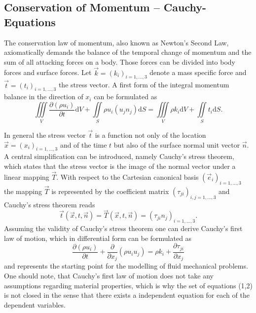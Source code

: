     \subsection{Conservation of Momentum -- Cauchy-Equations}

    The conservation law of momentum, also known as Newton's Second Law, axiomatically demands the balance of the temporal change of momentum and the sum of all attacking forces on a body. Those forces can be divided into body forces and surface forces. Let \(\vec{k} = \left( k_i \right)_{i=1,\dots,3}\) denote a mass specific force and \(\vec{t} = \left(t_i\right)_{i=1,\dots,3}\) the stress vector. A first form of the integral momentum balance in the direction of \(x_i\) can be formulated as
    \begin{equation}
      \label{eq:cauchy}
      \iiint\limits_V \frac{\partial \left(\rho u_i \right)}{\partial t} \mathrm{d}V + \iint\limits_S \rho u_i \left( u_j n_j \right) \mathrm{d}S = \iiint\limits_V \rho k_i \mathrm{d}V + \iint\limits_S t_i \mathrm{d}S.
    \end{equation}

    In general the stress vector \(\vec{t}\) is a function not only of the location \(\vec{x} = \left( x_i \right)_{i = 1,\dots,3}\) and of the time \(t\) but also of the surface normal unit vector \(\vec{n}\). A central simplification can be introduced, namely Cauchy's stress theorem, which states that the stress vector is the image of the normal vector under a linear mapping \(\vec{T}\). With respect to the Cartesian canonical basis \(\left(\vec{e}_i \right)_{i = 1, \dots, 3}\) the mapping \(\vec{T}\) is represented by the coefficient matrix \( \left(\tau_{ji}\right)_{i,j = 1,\dots,3}\) and Cauchy's stress theorem reads
    \begin{displaymath}
      \vec{t}\left(\vec{x},t,\vec{n}\right) = \vec{T}(\vec{x},t,\vec{n}) = \left(\tau_{ji} n_j\right)_{i = 1, \dots, 3}.
    \end{displaymath}
    Assuming the validity of Cauchy's stress theorem one can derive Cauchy's first law of motion, which in differential form can be formulated as
    \begin{equation}
      \label{eq:cauchymotion}
      \frac{\partial \left(\rho u_i \right)}{\partial t} 
      + \frac{\partial}{\partial x_j}\left( \rho u_i u_j \right) 
      = \rho k_i + \frac{\partial \tau_{ji}}{\partial x_j}
    \end{equation}
    and represents the starting point for the modelling of fluid mechanical problems. One should note, that Cauchy's first law of motion does not take any assumptions regarding material properties, which is why the set of equations (1,2) is not closed in the sense that there exists a independent equation for each of the dependent variables.

